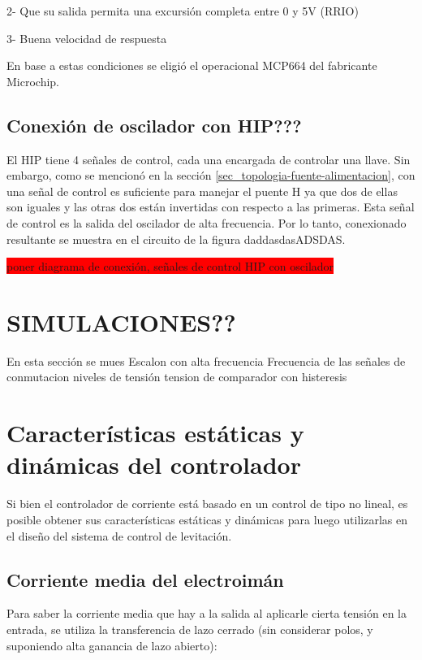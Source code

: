 2- Que su salida permita una excursión completa entre 0 y 5V (RRIO)

3- Buena velocidad de respuesta

En base a estas condiciones se eligió el operacional MCP664 del fabricante Microchip.


\subsection{Conexión de oscilador con HIP???}
El HIP tiene 4 señales de control, cada una encargada de controlar una llave. Sin embargo, como se mencionó en la sección \ref{sec_topologia-fuente-alimentacion}, con una señal de control es suficiente para manejar el puente H ya que dos de ellas son iguales y las otras dos están invertidas con respecto a las primeras. Esta señal de control es la salida del oscilador de alta frecuencia. Por lo tanto, conexionado resultante se muestra en el circuito de la figura daddasdasADSDAS.

\colorbox{red}{poner diagrama de conexión, señales de control HIP con oscilador}


\section{SIMULACIONES??}

En esta sección se mues
Escalon con alta frecuencia
Frecuencia de las señales de conmutacion
niveles de tensión
tension de comparador con histeresis

\section{Características estáticas y dinámicas del controlador}

Si bien el controlador de corriente está basado en un control de tipo no lineal, es posible obtener sus características estáticas y dinámicas para luego utilizarlas en el diseño del sistema de control de levitación.

\subsection{Corriente media del electroimán}

\noindent Para saber la corriente media que hay a la salida al aplicarle cierta tensión en la entrada, se utiliza la transferencia de lazo cerrado (sin considerar polos, y suponiendo alta ganancia de lazo abierto):


